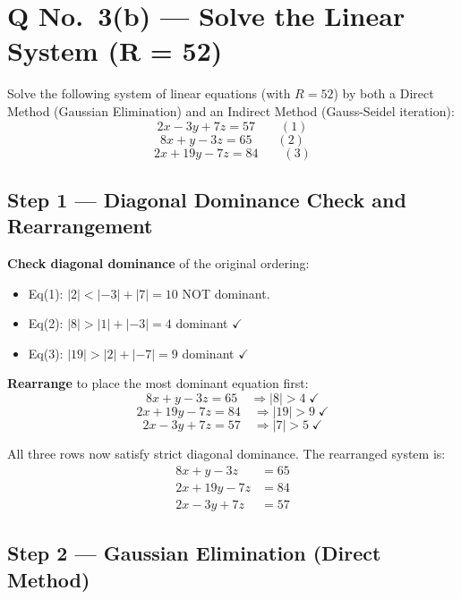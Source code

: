 \documentclass[12pt]{article}
\begin{document}
\newpage

\section{Q No.\ 3(b) --- Solve the Linear System (R = 52)}

\begin{problembox}
Solve the following system of linear equations (with $R = 52$) by both a Direct Method (Gaussian Elimination) and an Indirect Method (Gauss-Seidel iteration):
\[
  2x - 3y + 7z = 57 \qquad (1)
\]
\[
  8x + y - 3z = 65 \qquad (2)
\]
\[
  2x + 19y - 7z = 84 \qquad (3)
\]
\end{problembox}

\subsection*{Step 1 --- Diagonal Dominance Check and Rearrangement}

\textbf{Check diagonal dominance} of the original ordering:
\begin{itemize}[noitemsep]
  \item Eq(1): $|2| < |-3|+|7| = 10$ \quad NOT dominant.
  \item Eq(2): $|8| > |1|+|-3| = 4$ \quad dominant $\checkmark$
  \item Eq(3): $|19| > |2|+|-7| = 9$ \quad dominant $\checkmark$
\end{itemize}

\textbf{Rearrange} to place the most dominant equation first:
\[
  8x + y - 3z = 65 \quad\Rightarrow |8|>4 \;\checkmark
\]
\[
  2x + 19y - 7z = 84 \quad\Rightarrow |19|>9 \;\checkmark
\]
\[
  2x - 3y + 7z = 57 \quad\Rightarrow |7|>5 \;\checkmark
\]

\medskip
All three rows now satisfy strict diagonal dominance. The rearranged system is:
\begin{align}
  8x + y - 3z &= 65 \tag{R1}\\
  2x + 19y - 7z &= 84 \tag{R2}\\
  2x - 3y + 7z &= 57 \tag{R3}
\end{align}

\subsection*{Step 2 --- Gaussian Elimination (Direct Method)}
\end{document}
